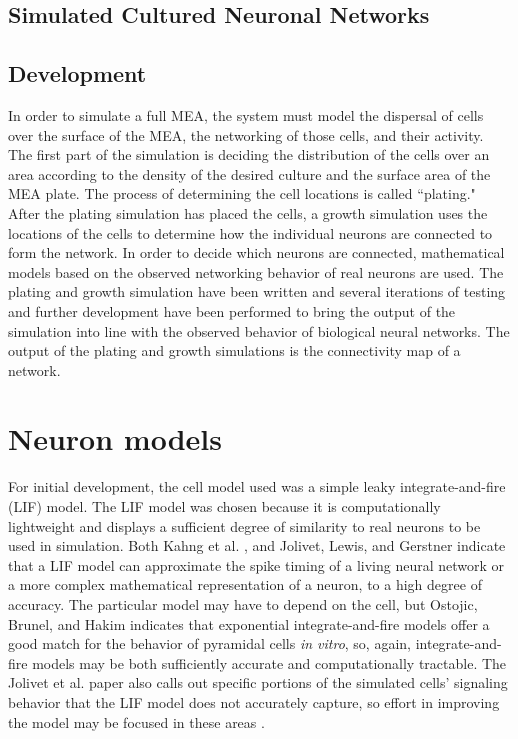 \documentclass[letterpaper]{article}
\begin{document}
\subsection{Simulated Cultured Neuronal Networks}

\subsection{Development}

In order to simulate a full MEA, the system must model the dispersal of cells over the surface of the MEA, the networking of those cells, and their activity. 
The first part of the simulation is deciding the distribution of the cells over an area according to the density of the desired culture and the surface area of the MEA plate. 
The process of determining the cell locations is called ``plating."
After the plating simulation has placed the cells, a growth simulation uses the locations of the cells to determine how the individual neurons are connected to form the network. 
In order to decide which neurons are connected, mathematical models based on the observed networking behavior of real neurons are used. 
The plating and growth simulation have been written and several iterations of testing and further development have been performed to bring the output of the simulation into line with the observed behavior of biological neural networks. 
The output of the plating and growth simulations is the connectivity map of a network. 

\section{Neuron models}

For initial development, the cell model used was a simple leaky integrate-and-fire (LIF) model. 
The LIF model was chosen because it is computationally lightweight and displays a sufficient degree of similarity to real neurons to be used in simulation. 
Both Kahng et al. \citeyear{kahng2007stochastic}, and Jolivet, Lewis, and Gerstner \citeyear{jolivet2004generalized} indicate that a LIF model can approximate the spike timing of a living neural network or a more complex mathematical representation of a neuron, to a high degree of accuracy. 
The particular model may have to depend on the cell, but Ostojic, Brunel, and Hakim \citeyear{ostojic2009connectivity} indicates that exponential integrate-and-fire models offer a good match for the behavior of pyramidal cells \emph{in vitro}, so, again, integrate-and-fire models may be both sufficiently accurate and computationally tractable. 
The Jolivet et al. paper also calls out specific portions of the simulated cells' signaling behavior that the LIF model does not accurately capture, so effort in improving the model may be focused in these areas \cite{jolivet2004generalized}. 
\end{document}

